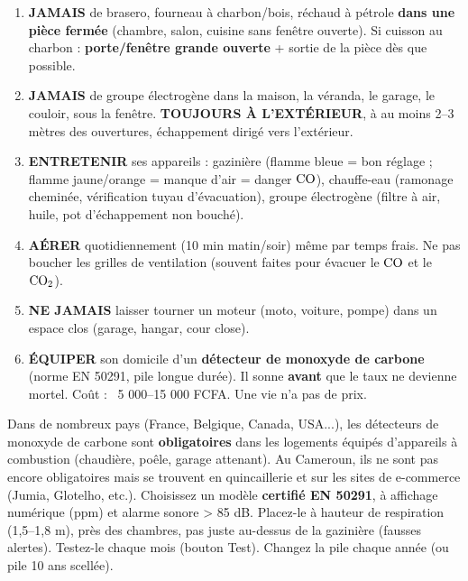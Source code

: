 \documentclass[11pt]{article}
\begin{document}
\begin{aretenir}
\begin{enumerate}
    \item \textbf{JAMAIS} de brasero, fourneau à charbon/bois, réchaud à pétrole \textbf{dans une pièce fermée} (chambre, salon, cuisine sans fenêtre ouverte). Si cuisson au charbon : \textbf{porte/fenêtre grande ouverte} + sortie de la pièce dès que possible.
    \item \textbf{JAMAIS} de groupe électrogène dans la maison, la véranda, le garage, le couloir, sous la fenêtre. \textbf{TOUJOURS À L'EXTÉRIEUR}, à au moins 2--3 mètres des ouvertures, échappement dirigé vers l'extérieur.
    \item \textbf{ENTRETENIR} ses appareils : gazinière (flamme bleue = bon réglage ; flamme jaune/orange = manque d'air = danger $\ce{CO}$), chauffe-eau (ramonage cheminée, vérification tuyau d'évacuation), groupe électrogène (filtre à air, huile, pot d'échappement non bouché).
    \item \textbf{AÉRER} quotidiennement (10 min matin/soir) même par temps frais. Ne pas boucher les grilles de ventilation (souvent faites pour évacuer le $\ce{CO}$ et le $\ce{CO2}$).
    \item \textbf{NE JAMAIS} laisser tourner un moteur (moto, voiture, pompe) dans un espace clos (garage, hangar, cour close).
    \item \textbf{ÉQUIPER} son domicile d'un \textbf{détecteur de monoxyde de carbone} (norme EN 50291, pile longue durée). Il sonne \textbf{avant} que le taux ne devienne mortel. Coût : ~5 000--15 000 FCFA. Une vie n'a pas de prix.
\end{enumerate}
\end{aretenir}

\begin{savaistu}
Dans de nombreux pays (France, Belgique, Canada, USA...), les détecteurs de monoxyde de carbone sont \textbf{obligatoires} dans les logements équipés d'appareils à combustion (chaudière, poêle, garage attenant). Au Cameroun, ils ne sont pas encore obligatoires mais se trouvent en quincaillerie et sur les sites de e-commerce (Jumia, Glotelho, etc.). Choisissez un modèle \textbf{certifié EN 50291}, à affichage numérique (ppm) et alarme sonore > 85 dB. Placez-le à hauteur de respiration (1,5--1,8 m), près des chambres, pas juste au-dessus de la gazinière (fausses alertes). Testez-le chaque mois (bouton Test). Changez la pile chaque année (ou pile 10 ans scellée).
\end{savaistu}
\end{document}
